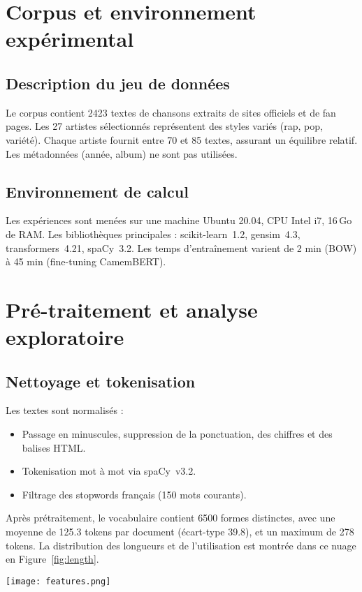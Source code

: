 \documentclass[a4paper,11pt]{article}
\begin{document}
\clearpage
\tableofcontents
\clearpage

\section{Corpus et environnement expérimental}
\subsection{Description du jeu de données}
Le corpus contient \num{2423} textes de chansons extraits de sites officiels et de fan pages. Les 27 artistes sélectionnés représentent des styles variés (rap, pop, variété). Chaque artiste fournit entre 70 et 85 textes, assurant un équilibre relatif. Les métadonnées (année, album) ne sont pas utilisées.

\subsection{Environnement de calcul}
Les expériences sont menées sur une machine Ubuntu 20.04, CPU Intel i7, 16\,Go de RAM. Les bibliothèques principales : scikit-learn~1.2, gensim~4.3, transformers~4.21, spaCy~3.2. Les temps d’entraînement varient de 2 min (BOW) à 45 min (fine-tuning CamemBERT).

\section{Pré-traitement et analyse exploratoire}
\subsection{Nettoyage et tokenisation}
Les textes sont normalisés :
\begin{itemize}
  \item Passage en minuscules, suppression de la ponctuation, des chiffres et des balises HTML.
  \item Tokenisation mot à mot via spaCy~v3.2.
  \item Filtrage des stopwords français (150 mots courants).
\end{itemize}
Après prétraitement, le vocabulaire contient \num{6500} formes distinctes, avec une moyenne de \num{125.3} tokens par document (écart-type \num{39.8}), et un maximum de 278 tokens. La distribution des longueurs et de l'utilisation est montrée dans ce nuage en Figure~\ref{fig:length}.

\begin{center}
    \texttt{[image: features.png]}
    \vspace{0.5em}
    \label{fig:length}
\end{center}
\end{document}
